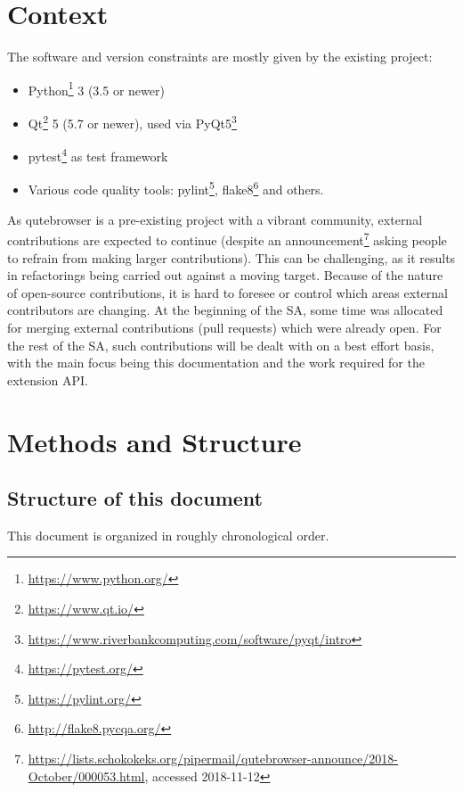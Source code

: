 \documentclass[a4paper,parskip=full]{scrreprt}
\begin{document}
\section{Context}
\label{context}

The software and version constraints are mostly given by the existing project:

\begin{itemize}
  \item Python\footnote{\url{https://www.python.org/}} 3 (3.5 or newer)
  \item Qt\footnote{\url{https://www.qt.io/}} 5 (5.7 or newer), used via PyQt5\footnote{\url{https://www.riverbankcomputing.com/software/pyqt/intro}}
  \item pytest\footnote{\url{https://pytest.org/}} as test framework
  \item Various code quality tools: pylint\footnote{\url{https://pylint.org/}},
    flake8\footnote{\url{http://flake8.pycqa.org/}} and others.
\end{itemize}

As qutebrowser is a pre-existing project with a vibrant community, external
contributions are expected to continue (despite an
announcement\footnote{\url{https://lists.schokokeks.org/pipermail/qutebrowser-announce/2018-October/000053.html}, accessed 2018-11-12}
asking people to refrain from making larger contributions). This can be challenging,
as it results in refactorings being carried out against a moving target. Because
of the nature of open-source contributions,
it is hard to foresee or control which areas external contributors are changing.
At the beginning of the SA, some time was allocated for merging external
contributions (pull requests) which were already open. For the rest of the SA,
such contributions will be dealt with on a best effort basis, with the main
focus being this documentation and the work required for the extension API.

\section{Methods and Structure}
\subsection{Structure of this document}
This document is organized in roughly chronological order.
\end{document}
